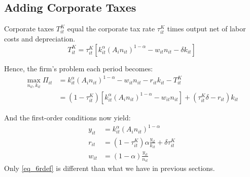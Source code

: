 \documentclass[letterpaper,12pt]{article}
\theoremstyle{definition}
\numberwithin{equation}{section}
\begin{document}
\begin{spacing}{1.5}


\newpage
\section{Adding Corporate Taxes}
	Corporate taxes $T^K_{it}$ equal the corporate tax rate $\tau^K_{it}$ times output net of labor costs and depreciation.
	\begin{equation}
		T^K_{it} = \tau^K_{it} \left[ k_{it}^\alpha \left( A_{i} n_{it} \right)^{1-\alpha} - w_{it}n_{it} - \delta k_{it} \right]
	\end{equation}

	Hence, the firm's problem each period becomes:
	\begin{align}
		\max_{n_{it},k_{it}} \Pi_{it} & = k_{it}^\alpha \left( A_{i} n_{it} \right)^{1-\alpha} - w_{it}n_{it} - r_{it}k_{it} - T^K_{it} \nonumber \\
		& = (1-\tau^K_{it})\left[k_{it}^\alpha \left( A_{i} n_{it} \right)^{1-\alpha} - w_{it}n_{it}\right] + (\tau^K_{it} \delta - r_{it})k_{it} \nonumber
	\end{align}	

	And the first-order conditions now yield:
	\begin{align}
		y_{it} & = k_{it}^\alpha \left( A_{i} n_{it} \right)^{1-\alpha} \nonumber \\
		r_{it} & = (1-\tau^K_{it})\alpha \frac{y_{it}}{k_{it}} + \delta \tau^K_{it} \label{eq_6rdef} \\
		w_{it} & = (1-\alpha) \frac{y_{it}}{n_{it}} \nonumber
	\end{align}
	Only \eqref{eq_6rdef} is different than what we have in previous sections.


\end{spacing}
\end{document}

